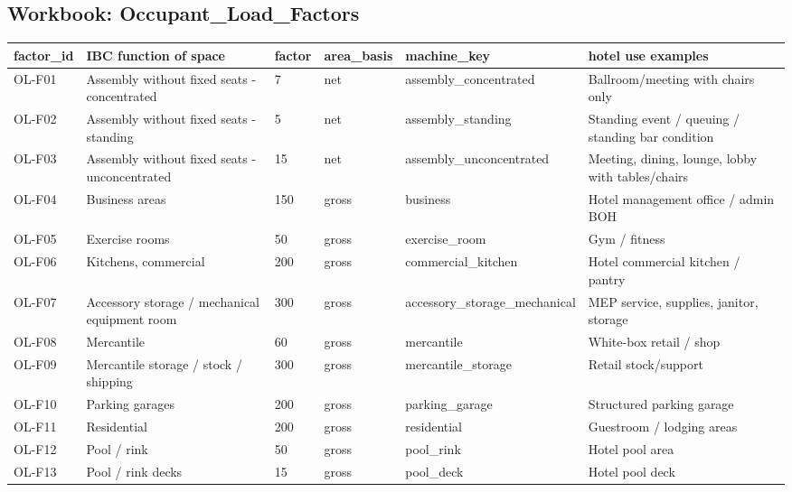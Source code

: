 \documentclass[10pt]{article}
\begin{document}
\subsection{Workbook: Occupant\_Load\_Factors}
\begin{longtable}{p{3cm}p{3cm}p{3cm}p{3cm}p{3cm}p{3cm}}
\toprule
factor\_id & IBC function of space & factor & area\_basis & machine\_key & hotel use examples \\ \midrule \endhead
OL-F01 & Assembly without fixed seats - concentrated & 7 & net & assembly\_concentrated & Ballroom/meeting with chairs only \\
OL-F02 & Assembly without fixed seats - standing & 5 & net & assembly\_standing & Standing event / queuing / standing bar condition \\
OL-F03 & Assembly without fixed seats - unconcentrated & 15 & net & assembly\_unconcentrated & Meeting, dining, lounge, lobby with tables/chairs \\
OL-F04 & Business areas & 150 & gross & business & Hotel management office / admin BOH \\
OL-F05 & Exercise rooms & 50 & gross & exercise\_room & Gym / fitness \\
OL-F06 & Kitchens, commercial & 200 & gross & commercial\_kitchen & Hotel commercial kitchen / pantry \\
OL-F07 & Accessory storage / mechanical equipment room & 300 & gross & accessory\_storage\_mechanical & MEP service, supplies, janitor, storage \\
OL-F08 & Mercantile & 60 & gross & mercantile & White-box retail / shop \\
OL-F09 & Mercantile storage / stock / shipping & 300 & gross & mercantile\_storage & Retail stock/support \\
OL-F10 & Parking garages & 200 & gross & parking\_garage & Structured parking garage \\
OL-F11 & Residential & 200 & gross & residential & Guestroom / lodging areas \\
OL-F12 & Pool / rink & 50 & gross & pool\_rink & Hotel pool area \\
OL-F13 & Pool / rink decks & 15 & gross & pool\_deck & Hotel pool deck \\
\bottomrule\end{longtable}
\end{document}
